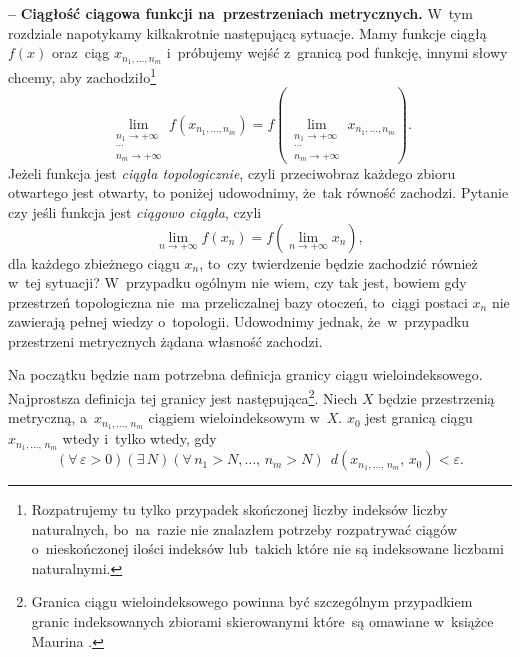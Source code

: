 \documentclass[a4paper,11pt]{article}
\newcommand{\ld}{\ldots}
\newcommand{\ra}{\rightarrow}
\newcommand{\wtw}{wtedy i~tylko wtedy}
\newcommand{\veps}{\varepsilon}
\newcommand{\Lim}{\lim\limits}
\newcommand{\tb}{\textbf}
\newcommand{\noi}{\noindent}
\newcommand{\start}{\noi \tb{--} {}}
\begin{document}
\start \tb{Ciągłość ciągowa funkcji na~przestrzeniach metrycznych.}
W~tym rozdziale napotykamy kilkakrotnie następującą sytuacje. Mamy
funkcje ciągłą $f( x )$ oraz~ciąg $x_{ n_{ 1 }, \ld, n_{ m } }$
i~próbujemy wejść z~granicą pod funkcję, innymi słowy chcemy, aby
zachodziło\footnote{Rozpatrujemy tu tylko przypadek skończonej liczby
  indeksów liczby naturalnych, bo~na~razie nie znalazłem potrzeby
  rozpatrywać ciągów o~nieskończonej ilości indeksów lub~takich które
  nie są indeksowane liczbami naturalnymi.}
\begin{equation*}
  \Lim_{ \substack{ n_{ 1 } \ra +\infty \\ \cdots \\  n_{ m } \ra +\infty } }
  f( x_{ n_{ 1 }, \ld, n_{ m } } )
  = f( \Lim_{ \substack{ n_{ 1 } \ra +\infty \\ \cdots \\ n_{ m } \ra +\infty } }
  x_{ n_{ 1 }, \ld, n_{ m } } ).
\end{equation*}
Jeżeli funkcja jest \emph{ciągła topologicznie}, czyli przeciwobraz
każdego zbioru otwartego jest otwarty, to poniżej udowodnimy, że~tak
równość zachodzi. Pytanie czy jeśli funkcja jest \emph{ciągowo
  ciągła}, czyli
\begin{equation*}
  \Lim_{ n \ra +\infty } f( x_{ n } ) = f( \Lim_{ n \ra +\infty } x_{ n } ),
\end{equation*}
dla każdego zbieżnego ciągu $x_{ n }$, to~czy twierdzenie będzie
zachodzić również w~tej sytuacji? W~przypadku ogólnym nie wiem, czy
tak jest, bowiem gdy przestrzeń topologiczna nie~ma przeliczalnej bazy
otoczeń, to~ciągi postaci $x_{ n }$ nie zawierają pełnej wiedzy
o~topologii. Udowodnimy jednak, że~w~przypadku przestrzeni metrycznych
żądana własność zachodzi.

Na początku będzie nam potrzebna definicja granicy ciągu
wieloindeksowego. Najprostsza definicja tej granicy jest
następująca\footnote{Granica ciągu wieloindeksowego powinna być
  szczególnym przypadkiem granic indeksowanych zbiorami skierowanymi
  które~są omawiane w~książce Maurina \cite{Maurin74}.}. Niech $X$
będzie przestrzenią metryczną, a~$x_{ n_{ 1 }, \ld, \, n_{ m } }$
ciągiem wieloindeksowym w~$X$. $x_{ 0 }$ jest granicą ciągu
$x_{ n_{ 1 }, \ld, \, n_{ m } }$ \wtw, gdy
\begin{displaymath}
  ( \forall \, \veps > 0) ( \exists \, N )
  ( \forall \, n_{ 1 } > N, \ld, \, n_{ m } > N ) \;\,
  d( x_{ n_{ 1 }, \ld, \, n_{ m } }, \, x_{ 0 } ) < \veps.
\end{displaymath}
\end{document}
